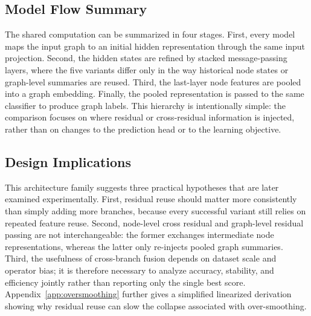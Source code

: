 \subsection{Model Flow Summary}

The shared computation can be summarized in four stages. First, every model maps the input graph to an initial hidden representation through the same input projection. Second, the hidden states are refined by stacked message-passing layers, where the five variants differ only in the way historical node states or graph-level summaries are reused. Third, the last-layer node features are pooled into a graph embedding. Finally, the pooled representation is passed to the same classifier to produce graph labels. This hierarchy is intentionally simple: the comparison focuses on where residual or cross-residual information is injected, rather than on changes to the prediction head or to the learning objective.

\subsection{Design Implications}

This architecture family suggests three practical hypotheses that are later examined experimentally. First, residual reuse should matter more consistently than simply adding more branches, because every successful variant still relies on repeated feature reuse. Second, node-level cross residual and graph-level residual passing are not interchangeable: the former exchanges intermediate node representations, whereas the latter only re-injects pooled graph summaries. Third, the usefulness of cross-branch fusion depends on dataset scale and operator bias; it is therefore necessary to analyze accuracy, stability, and efficiency jointly rather than reporting only the single best score. Appendix~\ref{app:oversmoothing} further gives a simplified linearized derivation showing why residual reuse can slow the collapse associated with over-smoothing.
